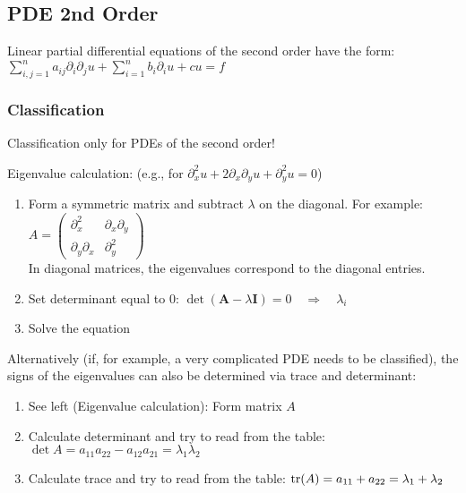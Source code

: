 
\subsection{PDE 2nd Order}
Linear partial differential equations of the second order have the form:
$\boxed{\sum\limits_{i,j=1}^{n}{a_{ij}\partial_i\partial_j u}+\sum\limits_{i=1}^{n}{b_i\partial_i u}+cu=f}$

\subsubsection{Classification}
Classification only for PDEs of the second order!

\begin{minipage}{9cm}
  Eigenvalue calculation: (e.g., for $ \partial^2_xu+2\partial_x\partial_yu+\partial^2_yu=0 $) 
  \begin{enumerate}
    \item Form a symmetric matrix and subtract $\lambda$ on the diagonal. For example: $A = \begin{pmatrix}
      \partial_x^2 & \partial_x \partial_y \\
      \partial_y \partial_x  & \partial_y^2
    \end{pmatrix}$\\
    In diagonal matrices, the eigenvalues correspond to the diagonal entries.
    \item Set determinant equal to 0: $\det(\mathbf{A}-\lambda \mathbf{I}) = 0\quad\Rightarrow\quad \lambda_i$
    \item Solve the equation
  \end{enumerate}
\end{minipage}
\begin{minipage}{9cm}
  Alternatively (if, for example, a very complicated PDE needs to be classified), the signs of the eigenvalues can also be determined via trace and determinant:
  \begin{enumerate}
    \item See left (Eigenvalue calculation): Form matrix $A$
    \item Calculate determinant and try to read from the table:
     $\det A = a_{11}a_{22} - a_{12}a_{21} = \lambda_1 \lambda_2$
    \item Calculate trace and try to read from the table:
      $\operatorname{tr}(A) = a_{11} + a_{22} = \lambda_1 + \lambda_2$
  \end{enumerate}
\end{minipage}

